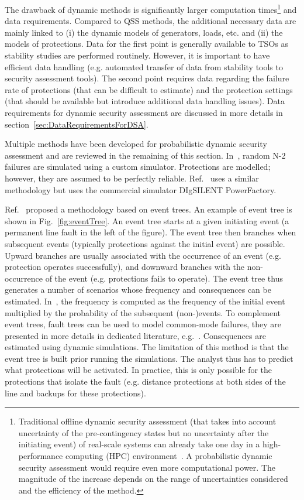 The drawback of dynamic methods is significantly larger computation times\footnote{Traditional offline dynamic security assessment (that takes into account uncertainty of the pre-contingency states but no uncertainty after the initiating event) of real-scale systems can already take one day in a high-performance computing (HPC) environment~\cite{EurostagHPC}. A probabilistic dynamic security assessment would require even more computational power. The magnitude of the increase depends on the range of uncertainties considered and the efficiency of the method.} and data requirements. Compared to QSS methods, the additional necessary data are mainly linked to (i) the dynamic models of generators, loads, etc. and (ii) the models of protections. Data for the first point is generally available to TSOs as stability studies are performed routinely. However, it is important to have efficient data handling (e.g. automated transfer of data from stability tools to security assessment tools). The second point requires data regarding the failure rate of protections (that can be difficult to estimate) and the protection settings (that should be available but introduce additional data handling issues). Data requirements for dynamic security assessment are discussed in more details in section~\ref{sec:DataRequirementsForDSA}.

Multiple methods have been developed for probabilistic dynamic security assessment and are reviewed in the remaining of this section. In~\cite{SongThesis, SongPaper}, random N-2 failures are simulated using a custom simulator. Protections are modelled; however, they are assumed to be perfectly reliable. Ref.~\cite{Preece1000RandomDynN-2} uses a similar methodology but uses the commercial simulator DIgSILENT PowerFactory.

Ref.~\cite{Haarla, GridPSA} proposed a methodology based on event trees. An example of event tree is shown in Fig.~\ref{fig:eventTree}. An event tree starts at a given initiating event (a permanent line fault in the left of the figure). The event tree then branches when subsequent events (typically protections against the initial event) are possible. Upward branches are usually associated with the occurrence of an event (e.g. protection operates successfully), and downward branches with the non-occurrence of the event (e.g. protections fails to operate). The event tree thus generates a number of scenarios whose frequency and consequences can be estimated. In~\cite{Haarla, GridPSA}, the frequency is computed as the frequency of the initial event multiplied by the probability of the subsequent (non-)events. To complement event trees, fault trees can be used to model common-mode failures, they are presented in more details in dedicated literature, e.g.~\cite{FaultTreeHandbook}. Consequences are estimated using dynamic simulations. The limitation of this method is that the event tree is built prior running the simulations. The analyst thus has to predict what protections will be activated. In practice, this is only possible for the protections that isolate the fault (e.g. distance protections at both sides of the line and backups for these protections).

